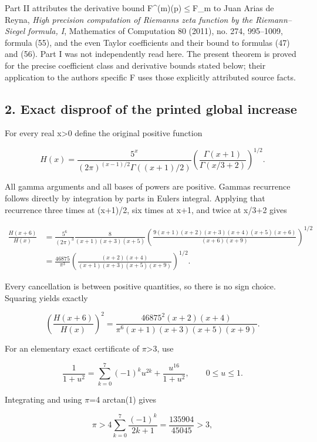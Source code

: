 \documentclass{article}
\begin{document}
Part II attributes the derivative bound \textbar F\^{}(m)(p)\textbar\ensuremath{\le}F\_m to Juan Arias de Reyna, \emph{High precision computation of Riemann\textquotesingle s zeta function by the Riemann--Siegel formula, I}, Mathematics of Computation 80 (2011), no. 274, 995--1009, formula (55), and the even Taylor coefficients and their bound to formulas (47) and (56). Part I was not independently read here. The present theorem is proved for the precise coefficient class and derivative bounds stated below; their application to the author\textquotesingle s specific F uses those explicitly attributed source facts.

\subsection{2. Exact disproof of the printed global increase}\label{exact-disproof-of-the-printed-global-increase}

For every real x\textgreater0 define the original positive function

\[
H(x)=\frac{5^x}{(2\pi)^{(x-1)/2}\Gamma((x+1)/2)}
\left(\frac{\Gamma(x+1)}{\Gamma(x/3+2)}\right)^{1/2}.
\]

All gamma arguments and all bases of powers are positive. Gamma\textquotesingle s recurrence follows directly by integration by parts in Euler\textquotesingle s integral. Applying that recurrence three times at (x+1)/2, six times at x+1, and twice at x/3+2 gives

\[
\begin{aligned}
\frac{H(x+6)}{H(x)}
&=\frac{5^6}{(2\pi)^3}
\frac{8}{(x+1)(x+3)(x+5)}
\left(\frac{9(x+1)(x+2)(x+3)(x+4)(x+5)(x+6)}
{(x+6)(x+9)}\right)^{1/2}\\
&=\frac{46875}{\pi^3}
\left(\frac{(x+2)(x+4)}
{(x+1)(x+3)(x+5)(x+9)}\right)^{1/2}.
\end{aligned}
\]

Every cancellation is between positive quantities, so there is no sign choice. Squaring yields exactly

\[
\boxed{\left(\frac{H(x+6)}{H(x)}\right)^2
=\frac{46875^2(x+2)(x+4)}
{\pi^6(x+1)(x+3)(x+5)(x+9)}.}
\]

For an elementary exact certificate of \ensuremath{\pi}\textgreater3, use

\[
\frac1{1+u^2}=\sum_{k=0}^{7}(-1)^k u^{2k}
+\frac{u^{16}}{1+u^2},\qquad 0\le u\le1.
\]

Integrating and using \ensuremath{\pi}=4 arctan(1) gives

\[
\pi>4\sum_{k=0}^{7}\frac{(-1)^k}{2k+1}
=\frac{135904}{45045}>3,
\]
\end{document}
